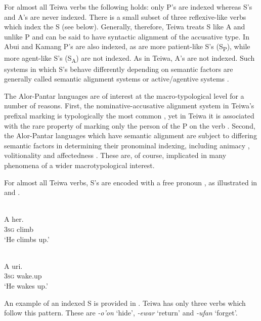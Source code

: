 For almost all Teiwa verbs the following holds: only P's are indexed whereas S's and A's are never indexed. There is a small subset of three reflexive-like verbs which index the S (see below). Generally, therefore, Teiwa treats S like A and unlike P and can be said to have syntactic alignment of the accusative type. In Abui  and Kamang  P's are also indexed, as are more patient-like S's (S\textsubscript{P}), while more agent-like S's (S\textsubscript{A}) are not indexed. As in Teiwa, A's are not indexed. Such systems in which S's behave differently depending on semantic factors are generally called semantic alignment systems \citep{DonohueEtAl2008} or active/agentive systems \citep{Mithun1991}.

The Alor-Pantar languages are of interest at the macro-typological level for a number of reasons. First, the nominative-accusative alignment system in Teiwa's prefixal marking is typologically the most common \citep[53]{Siewierska2004}, yet in Teiwa it is associated with the rare property of marking only the person  of the P on the verb \citep{Siewierska2013}. Second, the Alor-Pantar languages which have semantic alignment are subject to differing semantic factors in determining their pronominal indexing, including animacy , volitionality  and affectedness . These are, of course, implicated in many phenomena of a wider macrotypological interest.

For almost all Teiwa verbs, S's are encoded with a free pronoun , as illustrated in  and .


\ea 
\label{ex:10:1234}
 \\
 \gll    A   her. \\
   3\textsc{sg}  climb \\
  \glt `He climbs up.'
\z



\ea%
\label{bkm:Ref383697262}
 \\
\gll       A  uri.\\  
     3\textsc{sg} wake.up \\
\glt  `He wakes up.'
\z







An example of an indexed S is provided in . Teiwa has only three verbs which follow this pattern. These are \textit{{}-o'on} `hide', \textit{{}-ewar} `return' and \textit{{}-ufan} `forget'. 


